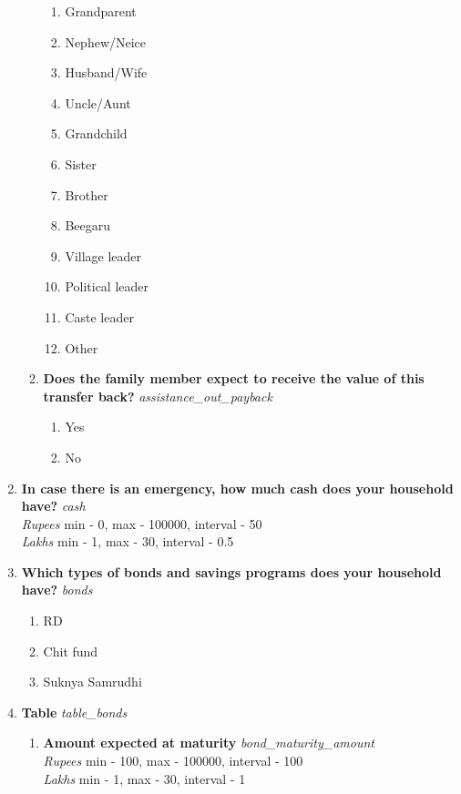 \documentclass{article}
\begin{document}
\begin{enumerate}
\begin{enumerate}[label*=\arabic*.]
\begin{enumerate}
\item Grandparent 
\item Nephew/Neice 
\item Husband/Wife 
\item Uncle/Aunt 
\item Grandchild 
\item Sister 
\item Brother 
\item Beegaru 
\item Village leader 
\item Political leader 
\item Caste leader 
\item Other 
\end{enumerate} 
\item {\bfseries Does the family member expect to receive the value of this transfer back?}\emph{ assistance\_out\_payback } 
\begin{enumerate} 
\item Yes 
\item No 
\end{enumerate} 
\end{enumerate} 
\item {\bfseries In case there is an emergency, how much cash does your household have? }\emph{ cash } 
\\ \emph{ Rupees }min - 0, max - 100000, interval - 50 
\\ \emph{ Lakhs }min - 1, max - 30, interval - 0.5 
 
\item {\bfseries Which types of bonds and savings programs does your household have?}\emph{ bonds } 
\begin{enumerate} 
\item RD 
\item Chit fund 
\item Suknya Samrudhi 
\end{enumerate} 
\item {\bfseries Table}\emph{ table\_bonds } 
\begin{enumerate}[label*=\arabic*.] 
\item {\bfseries Amount expected at maturity}\emph{ bond\_maturity\_amount } 
\\ \emph{ Rupees }min - 100, max - 100000, interval - 100 
\\ \emph{ Lakhs }min - 1, max - 30, interval - 1 
 

\end{enumerate}
\end{enumerate}
\end{document}
